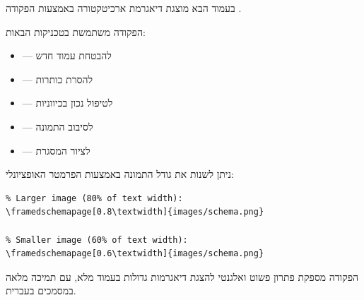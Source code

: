 \documentclass[book]{hebrew-academic-template}
\begin{document}

בעמוד הבא מוצגת דיאגרמת ארכיטקטורה באמצעות הפקודה .




הפקודה משתמשת בטכניקות הבאות:
\begin{itemize}
    \item {} --- להבטחת עמוד חדש
    \item {} --- להסרת כותרות
    \item {} --- לטיפול נכון בכיווניות
    \item {} --- לסיבוב התמונה
    \item {} --- לציור המסגרת
\end{itemize}


ניתן לשנות את גודל התמונה באמצעות הפרמטר האופציונלי:

\begin{english}
\begin{verbatim}
% Larger image (80% of text width):
\framedschemapage[0.8\textwidth]{images/schema.png}

% Smaller image (60% of text width):
\framedschemapage[0.6\textwidth]{images/schema.png}
\end{verbatim}
\end{english}



הפקודה  מספקת פתרון פשוט ואלגנטי להצגת דיאגרמות גדולות בעמוד מלא, עם תמיכה מלאה במסמכים בעברית.
\end{document}
